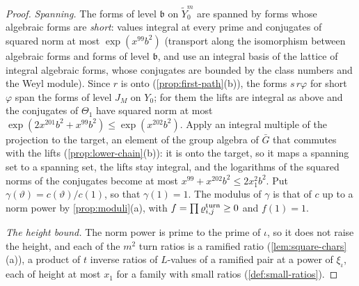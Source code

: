 \begin{proof}
\emph{Spanning.} The forms of level $\mathfrak b$ on $\tilde Y^m_0$ are spanned by forms whose algebraic forms are \emph{short}: values integral at every prime and conjugates of squared norm at most $\exp(x^{99}b^2)$ (transport along the
isomorphism between algebraic forms and forms of level $\mathfrak b$, and use an integral basis of the lattice of integral algebraic forms, whose conjugates are bounded by the class numbers and the Weyl module). Since $r$ is onto
(\cref{prop:first-path}(b)), the forms $s\,r\varphi$ for short $\varphi$ span the forms of level $J_M$ on $Y_0$; for them the lifts are integral as above and the conjugates of $\Theta_1$ have squared norm at most
$\exp(2x^{201}b^2+x^{99}b^2)\le\exp(x^{202}b^2)$. Apply an integral multiple of the projection to the target, an element of the group algebra of $\bar G$ that
commutes with the lifts (\cref{prop:lower-chain}(b)): it is onto the target, so it maps a spanning set to a spanning set, the lifts stay integral, and the logarithms of the squared norms of the conjugates
become at most $x^{99}+x^{202}b^2\le2x_1^2b^2$. Put $\gamma(\vartheta)=c(\vartheta)/c(1)$, so that $\gamma(1)=1$. The modulus of $\gamma$ is that of $c$ up to a norm power by
\cref{prop:moduli}(a), with $f=\prod\varrho^{\rm turn}_{i,j}\ge0$ and $f(1)=1$.

\emph{The height bound.} The norm power is prime to the prime of $\iota$, so it does not raise the height, and each of the $m^2$ turn ratios is a ramified ratio (\cref{lem:square-chars}(a)), a product of $t$ inverse ratios of $L$-values of a
ramified pair at a power of $\xi_\iota$, each of height at most $x_1$ for a family with small ratios (\cref{def:small-ratios}).
\end{proof}
